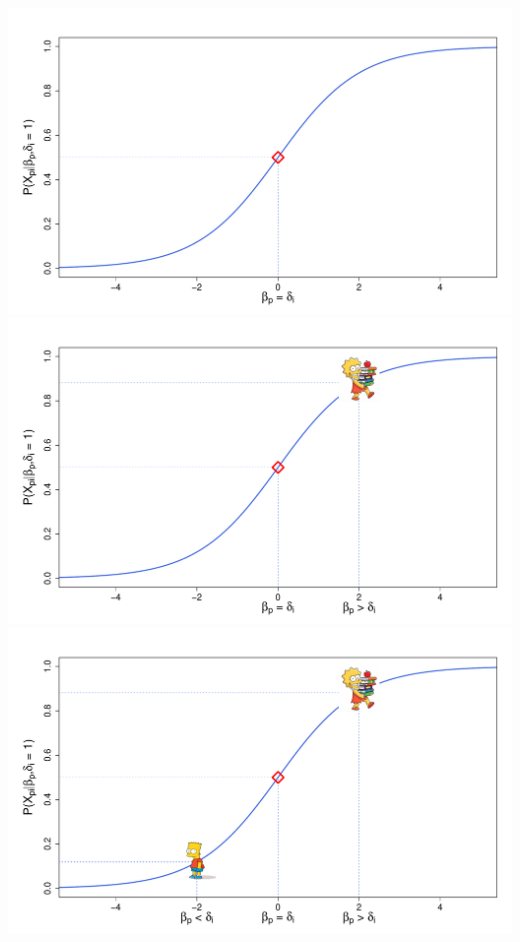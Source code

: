 \documentclass{beamer}
\begin{document}
\begin{frame}

	\begin{overprint}
		\centering
	\includegraphics[width=\linewidth]{base.pdf}
	\onslide<2>\includegraphics[width=\linewidth]{lisa.pdf}
	\onslide<3>\includegraphics[width=\linewidth]{bart.pdf}
\end{overprint}
\end{frame}
\end{document}
